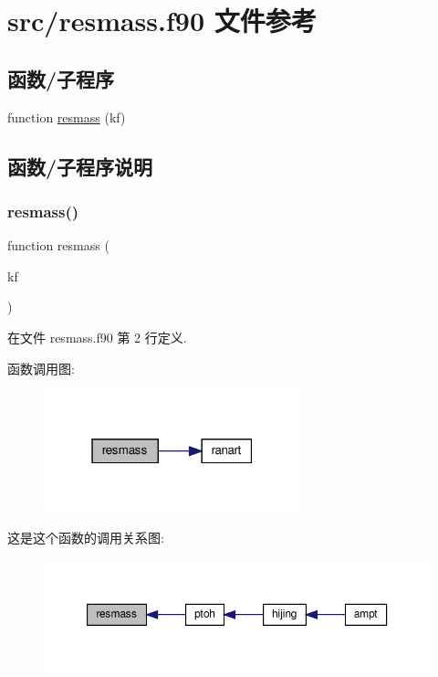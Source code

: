 \hypertarget{resmass_8f90}{}\section{src/resmass.f90 文件参考}
\label{resmass_8f90}
\subsection*{函数/子程序}
\begin{DoxyCompactItemize}
\item 
function \mbox{\hyperlink{resmass_8f90_ab1219677ed346e656a9f0d8acee1344e}{resmass}} (kf)
\end{DoxyCompactItemize}


\subsection{函数/子程序说明}
\mbox{\label{resmass_8f90_ab1219677ed346e656a9f0d8acee1344e}} 
\subsubsection{\texorpdfstring{resmass()}{resmass()}}
{\footnotesize\ttfamily function resmass (\begin{DoxyParamCaption}\item[{}]{kf }\end{DoxyParamCaption})}



在文件 resmass.\+f90 第 2 行定义.

函数调用图\+:
\nopagebreak
\begin{figure}[H]
\begin{center}
\leavevmode
\includegraphics[width=211pt]{resmass_8f90_ab1219677ed346e656a9f0d8acee1344e_cgraph}
\end{center}
\end{figure}
这是这个函数的调用关系图\+:
\nopagebreak
\begin{figure}[H]
\begin{center}
\leavevmode
\includegraphics[width=350pt]{resmass_8f90_ab1219677ed346e656a9f0d8acee1344e_icgraph}
\end{center}
\end{figure}
